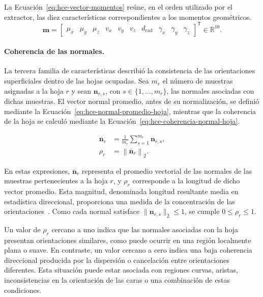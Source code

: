 La Ecuación~\eqref{eq:hce-vector-momentos} reúne, en el orden utilizado por el extractor, las diez características correspondientes a los momentos geométricos.
\begin{equation}
\mathbf m=
\begin{bmatrix}
\mu_x &
\mu_y &
\mu_z &
v_x &
v_y &
v_z &
d_{\mathrm{rad}} &
\gamma_x &
\gamma_y &
\gamma_z
\end{bmatrix}^{\mathsf T}
\in\mathbb R^{10}.
\label{eq:hce-vector-momentos}
\end{equation}

\paragraph{Coherencia de las normales.}

La tercera familia de características describió la consistencia de las
orientaciones superficiales dentro de las hojas ocupadas. Sea $m_r$ el
número de muestras asignadas a la hoja $r$ y sean
$\mathbf n_{r,s}$, con $s\in\{1,\ldots,m_r\}$, las normales asociadas
con dichas muestras. El vector normal promedio, antes de su
normalización, se definió mediante la
Ecuación~\eqref{eq:hce-normal-promedio-hoja}, mientras que la
coherencia de la hoja se calculó mediante la
Ecuación~\eqref{eq:hce-coherencia-normal-hoja}.

\begin{subequations}\label{eq:hce-coherencia-hoja}
\begin{align}
\overline{\mathbf n}_r
&=
\frac{1}{m_r}
\sum_{s=1}^{m_r}\mathbf n_{r,s},
\label{eq:hce-normal-promedio-hoja}\\
\rho_r
&=
\left\|
\overline{\mathbf n}_r
\right\|_2.
\label{eq:hce-coherencia-normal-hoja}
\end{align}
\end{subequations}

En estas expresiones, $\overline{\mathbf n}_r$ representa el promedio
vectorial de las normales de las muestras pertenecientes a la hoja
$r$, y $\rho_r$ corresponde a la longitud de dicho vector promedio.
Esta magnitud, denominada longitud resultante media en estadística
direccional, proporciona una medida de la concentración de las
orientaciones~\parencite{mardia1999}. Como cada normal satisface
$\|\mathbf n_{r,s}\|_2\leq 1$, se cumple
$0\leq\rho_r\leq1$.

Un valor de $\rho_r$ cercano a uno indica que las normales asociadas con la hoja presentan orientaciones similares, como puede ocurrir en una región localmente plana o suave. En contraste, un valor cercano a cero indica una baja coherencia direccional producida por la dispersión o cancelación entre orientaciones diferentes. Esta situación puede estar asociada con regiones curvas, aristas, inconsistencias en la orientación de las caras o una combinación de estas condiciones.

